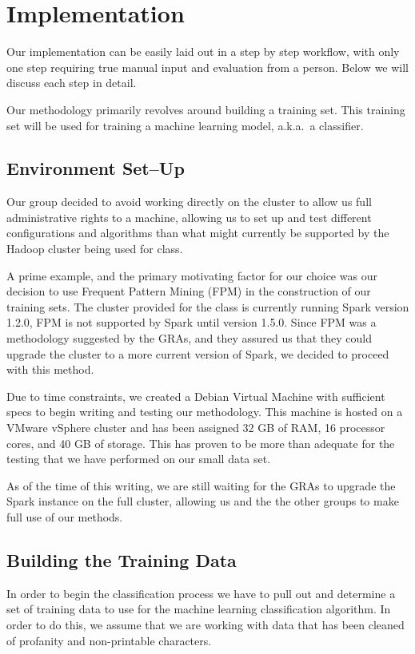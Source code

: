 \section{Implementation}
Our implementation can be easily laid out in a step by step workflow, with only one step requiring true manual input and evaluation from a person. Below we will discuss each step in detail.

Our methodology primarily revolves around building a training set. This training set will be used for training a machine learning model, a.k.a.\ a classifier.

\subsection{Environment Set--Up}
Our group decided to avoid working directly on the cluster to allow us full administrative rights to a machine, allowing us to set up and test different configurations and algorithms than what might currently be supported by the Hadoop cluster being used for class.

A prime example, and the primary motivating factor for our choice was our decision to use Frequent Pattern Mining (FPM) in the construction of our training sets. The cluster provided for the class is currently running Spark version 1.2.0, FPM is not supported by Spark until version 1.5.0. Since FPM was a methodology suggested by the GRAs, and they assured us that they could upgrade the cluster to a more current version of Spark, we decided to proceed with this method.

Due to time constraints, we created a Debian Virtual Machine with sufficient specs to begin writing and testing our methodology. This machine is hosted on a VMware vSphere cluster and has been assigned 32 GB of RAM, 16 processor cores, and 40 GB of storage. This has proven to be more than adequate for the testing that we have performed on our small data set.

As of the time of this writing, we are still waiting for the GRAs to upgrade the Spark instance on the full cluster, allowing us and the the other groups to make full use of our methods.

\subsection{Building the Training Data}
In order to begin the classification process we have to pull out and determine a set of training data to use for the machine learning classification algorithm. In order to do this, we assume that we are working with data that has been cleaned of profanity and non-printable characters.

